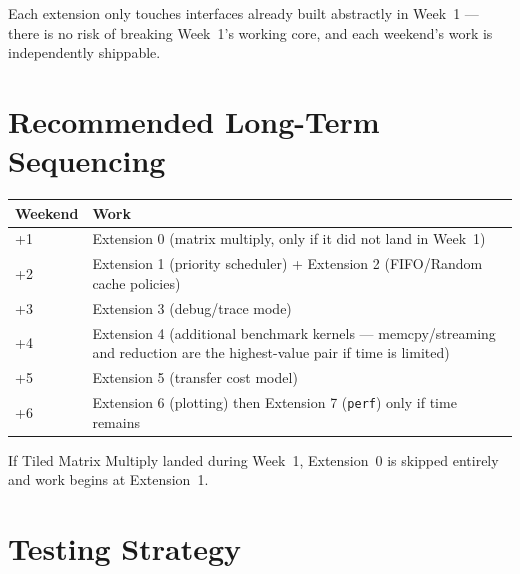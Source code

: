 \documentclass[11pt]{article}
\begin{document}
Each extension only touches interfaces already built abstractly in Week~1
--- there is no risk of breaking Week~1's working core, and each
weekend's work is independently shippable.

\section{Recommended Long-Term Sequencing}

\begin{center}
\end{center}

\begin{center}
\begin{tabularx}{\textwidth}{@{}p{2cm}X@{}}
\toprule
\textbf{Weekend} & \textbf{Work} \\
\midrule
+1 & Extension 0 (matrix multiply, only if it did not land in Week~1) \\
+2 & Extension 1 (priority scheduler) + Extension 2 (FIFO/Random cache
policies) \\
+3 & Extension 3 (debug/trace mode) \\
+4 & Extension 4 (additional benchmark kernels --- memcpy/streaming and
reduction are the highest-value pair if time is limited) \\
+5 & Extension 5 (transfer cost model) \\
+6 & Extension 6 (plotting) then Extension 7 (\texttt{perf}) only if time
remains \\
\bottomrule
\end{tabularx}
\end{center}

If Tiled Matrix Multiply landed during Week~1, Extension~0 is skipped
entirely and work begins at Extension~1.

\section{Testing Strategy}
\end{document}
